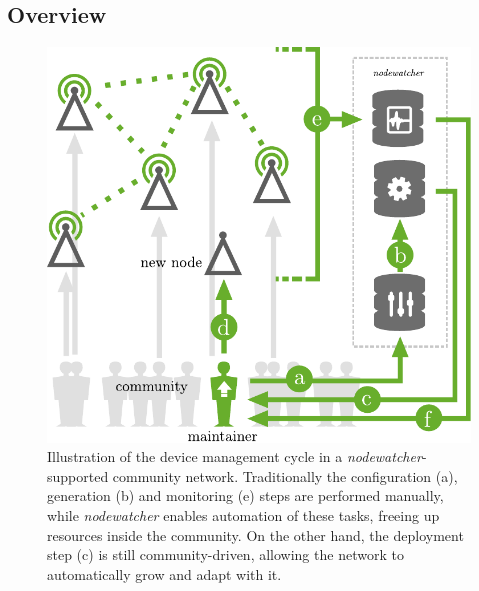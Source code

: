 \documentclass[5p,sort&compress]{elsarticle}
\newcommand{\nodewatcher}{\textit{nodewatcher}}
\begin{document}
\subsection{Overview}

\begin{figure}
  \centering
  \includegraphics[width=\columnwidth]{figures/device-mgmt-cycle.pdf}
  \caption{Illustration of the device management cycle in a \nodewatcher{}-supported community network. Traditionally the configuration (a), generation (b) and monitoring (e) steps are performed manually, while \nodewatcher{} enables automation of these tasks, freeing up resources inside the community. On the other hand, the deployment step (c) is still community-driven, allowing the network to automatically grow and adapt with it.}
  \label{fig:device-mgmt-cycle}
\end{figure}
\end{document}
